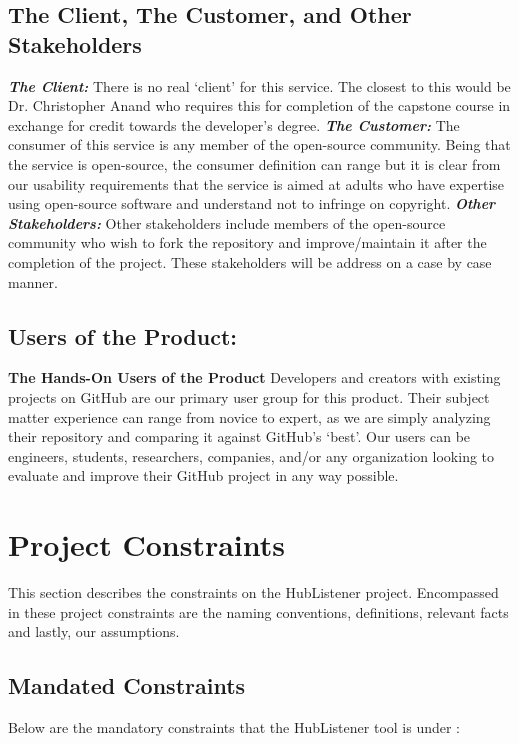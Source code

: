 \documentclass{article}
\begin{document}
\subsection{The Client, The Customer, and Other Stakeholders}
\textbf{\textit{The Client:}}
There is no real `client' for this service. The closest to this would be Dr. Christopher Anand who requires this for completion of the capstone course in exchange for credit towards the developer’s degree. \newline
\textbf{\textit{The Customer:}}
The consumer of this service is any member of the open-source community. Being that the service is open-source, the consumer definition can range but it is clear from our usability requirements that the service is aimed at adults who have expertise using open-source software and understand not to infringe on copyright. \newline
\textbf{\textit{Other Stakeholders:}}
Other stakeholders include members of the open-source community who wish to fork the repository and improve/maintain it after the completion of the project. These stakeholders will be address on a case by case manner. \newline

\subsection{Users of the Product:}
\textbf{The Hands-On Users of the Product}
\newline
Developers and creators with existing projects on GitHub are our primary user group for this product. Their subject matter experience can range from novice to expert, as we are simply analyzing their repository and comparing it against GitHub’s ‘best’. Our users can be engineers, students, researchers, companies, and/or any organization looking to evaluate and improve their GitHub project in any way possible. 
\newpage


\section{Project Constraints}
This section describes the constraints on the  HubListener project. Encompassed in these project constraints are the naming conventions, definitions, relevant facts and lastly, our assumptions.
\subsection{Mandated Constraints}
Below are the mandatory constraints that the HubListener tool is under : \newline
\end{document}
